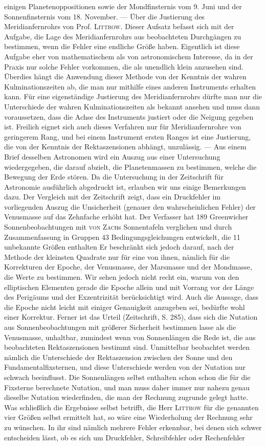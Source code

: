 einigen Planetenoppositionen sowie der Mondfinsternis vom 9. Juni und der Sonnenfinsternis vom 18. November. --- Über die Justierung des Meridianfernrohrs von Prof. \textsc{Littrow}. Dieser Aufsatz befasst sich mit der Aufgabe, die Lage des Meridianfernrohrs aus beobachteten Durchgängen zu bestimmen, wenn die Fehler eine endliche Größe haben. Eigentlich ist diese Aufgabe eher von mathematischem als von astronomischem Interesse, da in der Praxis nur solche Fehler vorkommen, die als unendlich klein anzusehen sind. Überdies hängt die Anwendung dieser Methode von der Kenntnis der wahren Kulminationszeiten ab, die man nur mithilfe eines anderen Instruments erhalten kann. Für eine eigenständige Justierung des Meridianfernrohrs dürfte man nur die Unterschiede der wahren Kulminationszeiten als bekannt ansehen und muss dann voraussetzen, dass die Achse des Instruments justiert oder die Neigung gegeben ist. Freilich eignet sich auch dieses Verfahren nur für Meridianfernrohre von geringerem Rang, und bei einem Instrument ersten Ranges ist eine Justierung, die von der Kenntnis der Rektaszensionen abhängt, unzulässig. --- Aus einem Brief desselben Astronomen wird ein Auszug aus einer Untersuchung wiedergegeben, die darauf abzielt, die Planetenmassen zu bestimmen, welche die Bewegung der Erde stören. Da die Untersuchung in der Zeitschrift für Astronomie ausführlich abgedruckt ist, erlauben wir uns einige Bemerkungen dazu. Der Vergleich mit der Zeitschrift zeigt, dass ein Druckfehler im vorliegenden Auszug die Unsicherheit (genauer den wahrscheinlichen Fehler) der Venusmasse auf das Zehnfache erhöht hat. Der Verfasser hat 189 Greenwicher Sonnenbeobachtungen mit \textsc{von Zach}s Sonnentafeln verglichen und durch Zusammenfassung in Gruppen 43 Bedingungsgleichungen entwickelt, die 11 unbekannte Größen enthalten Er beschränkt sich jedoch darauf, nach der Methode der kleinsten Quadrate nur für eine von ihnen, nämlich für die Korrekturen der Epoche, der Venusmasse, der Marsmasse und der Mondmasse, die Werte zu bestimmen. Wir sehen jedoch nicht recht ein, warum von den elliptischen Elementen gerade die Epoche allein und mit Vorrang vor der Länge des Perigäums und der Exzentrizität berücksichtigt wird. Auch die Aussage, dass die Epoche nicht leicht mit einiger Genauigkeit anzugeben sei, bedürfte wohl einer Korrektur. Ferner ist das Urteil (Zeitschrift, S. 285), dass sich die Nutation aus Sonnenbeobachtungen mit größerer Sicherheit bestimmen lasse als die Venusmasse, unhaltbar, zumindest wenn von Sonnenlängen die Rede ist, die aus beobachteten Rektaszensionen bestimmt sind. Unmittelbar beobachtet werden nämlich die Unterschiede der Rektaszension zwischen der Sonne und den Fundamentalfixsternen, und diese Unterschiede werden von der Nutation nur schwach beeinflusst. Die Sonnenlängen selbst enthalten schon schon die für die Fixsterne berechnete Nutation, und man muss daher immer nur nahezu genau dieselbe Nutation wiederfinden, die man der Rechnung zugrunde gelegt hatte. Was schließlich die Ergebnisse selbst betrifft, die Herr \textsc{Littrow} für die genannten vier Größen selbst ermittelt hat, so wäre eine Wiederholung der Rechnung sehr zu wünschen. In ihr sind nämlich mehrere Fehler erkennbar, bei denen sich schwer entscheiden lässt, ob es sich um Druckfehler, Schreibfehler oder Rechenfehler 
